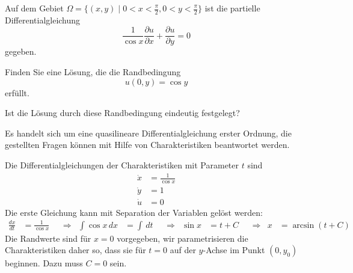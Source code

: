 Auf dem Gebiet $\Omega=\{(x,y)\;|\;0<x<\frac{\pi}2,0<y<\frac{\pi}{2}\}$
ist die partielle Differentialgleichung
\begin{equation}
\frac{1}{\cos x}\frac{\partial u}{\partial x}+\frac{\partial u}{\partial y}=0
\label{30000010:gleichung}
\end{equation}
gegeben.
\begin{teilaufgaben}
\item Finden Sie eine Lösung, die die Randbedingung
\[
u(0,y)=\cos y
\]
erfüllt.
\item Ist die Lösung durch diese Randbedingung eindeutig festgelegt?
\end{teilaufgaben}

\begin{loesung}
Es handelt sich um eine quasilineare Differentialgleichung erster Ordnung,
die gestellten Fragen können mit Hilfe von Charakteristiken beantwortet
werden.
\begin{teilaufgaben}
\item
Die Differentialgleichungen der Charakteristiken mit Parameter $t$
sind
\begin{align}
\dot x &= \frac1{\cos x}\label{30000010:1}\\
\dot y &= 1\label{30000010:2}\\
\dot u &= 0\label{30000010:3}
\end{align}
Die erste Gleichung kann mit Separation der Variablen gelöst werden:
\begin{align*}
\frac{dx}{dt}&=\frac1{\cos x}
&&\Rightarrow&
\int \cos x\,dx&=\int\, dt
&&\Rightarrow&
\sin x&=t + C
&&\Rightarrow&
x&=\arcsin(t + C)
\end{align*}
Die Randwerte sind für $x=0$ vorgegeben, wir parametrisieren die
Charakteristiken daher so, dass sie für $t=0$ auf der $y$-Achse
im Punkt $(0,y_0)$ beginnen. Dazu muss $C=0$ sein.


\end{teilaufgaben}
\end{loesung}
